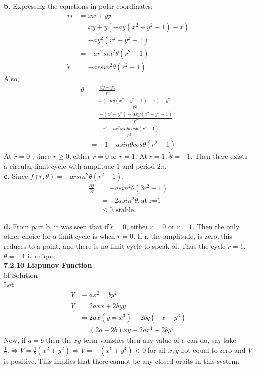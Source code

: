 \documentclass[12pt]{article}
\begin{document}
{\bf b. }Expressing the equations in polar coordinates:\\
\begin{align*}
r\dot{r} &= x\dot{x} + y\dot{y}\\
&=xy + y(-ay(x^2 + y^2 -1) - x)\\
&=-ay^2(x^2 + y^2 -1)\\
&=-ar^2sin^2\theta (r^2 - 1)\\
\dot{r} &= -arsin^2\theta(r^2 - 1)
\end{align*}
Also,
\begin{align*}
\dot{\theta} &= \frac{x\dot{y} - y\dot{x}}{r^2}\\
&= \frac{x(-ay(x^2 + y^2 -1) -x) - y^2}{r^2}\\
&= \frac{-(x^2+y^2) -axy(x^2 + y^2 -1)}{r^2}\\
&= \frac{-r^2 -ar^2sin\theta cos\theta (r^2-1)}{r^2}\\
&= -1 -asin\theta cos\theta (r^2 - 1)
\end{align*}
At $\dot{r}=0$ , since $r \geq 0$, either $r=0$ or $r=1$. At $r=1$, $\dot{\theta} = -1$.
Then there exists a circular limit cycle with amplitude 1 and period $2\pi$.\\

{\bf c. }Since $f(r,\theta) = -arsin^2\theta(r^2 -1 )$,\\
\begin{align*}
\frac{\partial f}{\partial r} &= -asin^2\theta(3r^2-1)\\
&=-2asin^2\theta, \text{at r=1}\\
&\leq 0, \text{stable.}
\end{align*}

{\bf d. }From part b, it was seen that if $\dot{r}=0$, either $r=0$ or $r=1$. Then the only other choice for a limit cycle is when $r=0$. If r, the amplitude, is zero, this reduces to a point, and there is no limit cycle to speak of. Thus the cycle $r=1$, $\dot{\theta} = -1$ is unique.\\

\noindent
{\bf 7.2.10 Liapunov Function} \\
{bf Solution: }\\
Let
\begin{align*}
V &=ax^2+by^2\\
\dot{V} &=2ax\dot{x}+2by \dot{y}\\
&= 2ax(y=x^3)+2by(-x-y^3)\\
&=(2a-2b)xy-2ax^4-2by^4
\end{align*}
Now, if $a=b$ then the $xy$ term vanishes then any value of $a$ can do, say take $\frac{1}{2}. \Rightarrow V=\frac{1}{2}(x^2+y^2) \Rightarrow \dot{V}=-(x^4+y^4)<0$ for all $x,y$ not equal to zero and $V$ is positive. This implies that there cannot be any closed orbits in this system.\\
\end{document}

